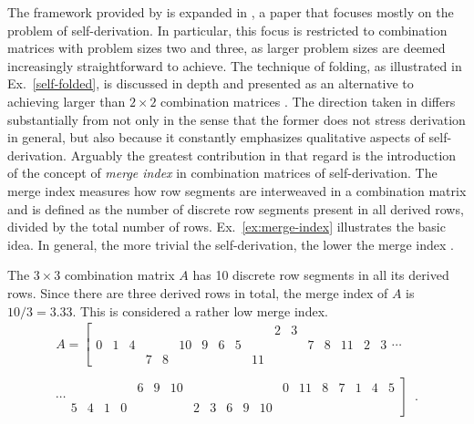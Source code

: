 The framework provided by \cite{Starr1984} is expanded in \cite{Kowalski1987a}, a paper that focuses mostly on the problem of self-derivation. In particular, this focus is restricted to combination matrices with problem sizes two and three, as larger problem sizes are deemed increasingly straightforward to achieve. The technique of folding, as illustrated in Ex.~\ref{self-folded}, is discussed in depth and presented as an alternative to achieving larger than $2 \times 2$ combination matrices \cite[298]{Kowalski1987a}. The direction taken in \cite{Kowalski1987a} differs substantially from \cite{Starr1984} not only in the sense that the former does not stress derivation in general, but also because it constantly emphasizes qualitative aspects of self-derivation. Arguably the greatest contribution in that regard is the introduction of the concept of \emph{merge index} in combination matrices of self-derivation. The merge index measures how row segments are interweaved in a combination matrix and is defined as the number of discrete row segments present in all derived rows, divided by the total number of rows. Ex.~\ref{ex:merge-index} illustrates the basic idea. In general, the more trivial the self-derivation, the lower the merge index \cite[310]{Kowalski1987a}.

\begin{example}
	\cite[314]{Kowalski1987a}
	\label{ex:merge-index}
    The $3 \times 3$ combination matrix $A$ has 10 discrete row segments in all its derived rows. Since there are three derived rows in total, the merge index of $A$ is $10 / 3 = 3.33$. This is considered a rather low merge index.
    \begin{multline}
        A = \left[
        \begin{array}{cccccccccccc|ccccc}
        &&&&&&&&&& 2 & 3 &&&&& \\
        0 & 1 & 4 &&& 10 & 9 & 6 & 5 &&&& 7 & 8 & 11 & 2 & 3 \\
        &&& 7 & 8 &&&&& 11 &&&&&&&
        \end{array}
        \right. \cdots \\\\
        \cdots \left.
        \begin{array}{ccccccc|cccccccccccc}
        &&&& 6 & 9 & 10 &&&&&& 0 & 11 & 8 & 7 & 1 & 4 & 5 \\
        &&&&&&&&&&&&&&&&&& \\
        5 & 4 & 1 & 0 &&&& 2 & 3 & 6 & 9 & 10 &&&&&&&
        \end{array}
        \right] \enspace.
    \end{multline}
\end{example}

